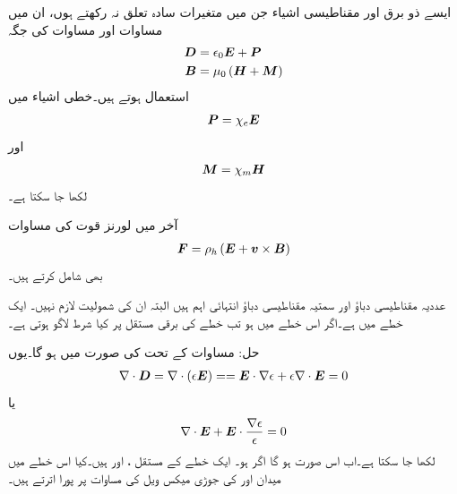 ایسے ذو برق اور مقناطیسی اشیاء جن میں متغیرات سادہ تعلق نہ رکھتے ہوں، ان میں مساوات  اور مساوات  کی جگہ
\begin{align}
{\ensuremath{{\boldsymbol{D}}}}&=\epsilon_0 {{\boldsymbol{E}}}+{{\boldsymbol{P}}}\\
{{\boldsymbol{B}}}&=\mu_0 \left({{\boldsymbol{H}}}+{{\boldsymbol{M}}} \right)
\end{align}
استعمال ہوتے ہیں۔خطی اشیاء میں
\begin{align}
{\ensuremath{{\boldsymbol{P}}}}=\chi_e {{\boldsymbol{E}}}
\end{align}
اور
\begin{align}
{\ensuremath{{\boldsymbol{M}}}}=\chi_m {{\boldsymbol{H}}}
\end{align}
لکھا جا سکتا ہے۔

آخر میں لورنز قوت کی مساوات 
\begin{align}
{\ensuremath{{\boldsymbol{F}}}}=\rho_h \left({{\boldsymbol{E}}}+{{\boldsymbol{v}}} \times {\ensuremath{{\boldsymbol{B}}}} \right)
\end{align}
بھی شامل کرتے ہیں۔

عددیہ مقناطیسی دباؤ  اور سمتیہ مقناطیسی دباؤ  انتہائی اہم ہیں البتہ ان کی شمولیت لازم نہیں۔
ایک خطے میں  ہے۔اگر اس خطے میں  ہو تب خطے کی برقی مستقل  پر کیا شرط لاگو ہوتی ہے۔

حل: مساوات  کے تحت  کی صورت میں  ہو گا۔یوں
\begin{align*}
\nabla \cdot {\ensuremath{{\boldsymbol{D}}}}=\nabla \cdot (\epsilon {\ensuremath{{\boldsymbol{E}}}})=={{\boldsymbol{E}}} \cdot \nabla \epsilon+\epsilon \nabla \cdot {\ensuremath{{\boldsymbol{E}}}}=0
\end{align*}
یا
\begin{align*}
\nabla \cdot {\ensuremath{{\boldsymbol{E}}}}+{{\boldsymbol{E}}} \cdot \frac{\nabla \epsilon}{\epsilon}=0
\end{align*}
لکھا جا سکتا ہے۔اب  اس صورت ہو گا اگر  ہو۔
ایک خطے کے مستقل ،  اور  ہیں۔کیا اس خطے میں میدان  اور  کی جوڑی میکس ویل کی مساوات پر پورا اترتے ہیں۔

